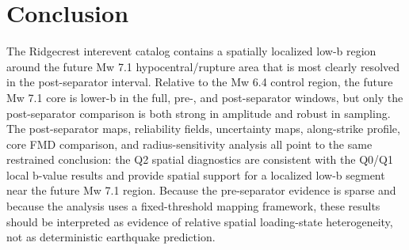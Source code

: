 \documentclass[11pt]{article}
\begin{document}
\section{Conclusion}
The Ridgecrest interevent catalog contains a spatially localized low-b region around the future Mw 7.1 hypocentral/rupture area that is most clearly resolved in the post-separator interval. Relative to the Mw 6.4 control region, the future Mw 7.1 core is lower-b in the full, pre-, and post-separator windows, but only the post-separator comparison is both strong in amplitude and robust in sampling. The post-separator maps, reliability fields, uncertainty maps, along-strike profile, core FMD comparison, and radius-sensitivity analysis all point to the same restrained conclusion: the Q2 spatial diagnostics are consistent with the Q0/Q1 local b-value results and provide spatial support for a localized low-b segment near the future Mw 7.1 region. Because the pre-separator evidence is sparse and because the analysis uses a fixed-threshold mapping framework, these results should be interpreted as evidence of relative spatial loading-state heterogeneity, not as deterministic earthquake prediction.
\end{document}
